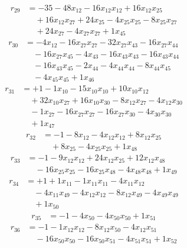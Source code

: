 \[\begin{aligned}
r_{29} &= - 35 - 48 x_{12} - 16 x_{12} x_{12} + 16 x_{12} x_{25} \\
 &\quad + 16 x_{12} x_{27} + 24 x_{25} - 4 x_{25} x_{25} - 8 x_{25} x_{27} \\
 &\quad + 24 x_{27} - 4 x_{27} x_{27} + 1 x_{45}
\end{aligned}\]
\[\begin{aligned}
r_{30} &= - 4 x_{12} - 16 x_{27} x_{27} - 32 x_{27} x_{43} - 16 x_{27} x_{44} \\
 &\quad - 16 x_{27} x_{45} - 4 x_{43} - 16 x_{43} x_{43} - 16 x_{43} x_{44} \\
 &\quad - 16 x_{43} x_{45} - 2 x_{44} - 4 x_{44} x_{44} - 8 x_{44} x_{45} \\
 &\quad - 4 x_{45} x_{45} + 1 x_{46}
\end{aligned}\]
\[\begin{aligned}
r_{31} &= + 1 - 1 x_{10} - 15 x_{10} x_{10} + 10 x_{10} x_{12} \\
 &\quad + 32 x_{10} x_{27} + 16 x_{10} x_{30} - 8 x_{12} x_{27} - 4 x_{12} x_{30} \\
 &\quad - 1 x_{27} - 16 x_{27} x_{27} - 16 x_{27} x_{30} - 4 x_{30} x_{30} \\
 &\quad + 1 x_{47}
\end{aligned}\]
\[\begin{aligned}
r_{32} &= - 1 - 8 x_{12} - 4 x_{12} x_{12} + 8 x_{12} x_{25} \\
 &\quad + 8 x_{25} - 4 x_{25} x_{25} + 1 x_{48}
\end{aligned}\]
\[\begin{aligned}
r_{33} &= - 1 - 9 x_{12} x_{12} + 24 x_{12} x_{25} + 12 x_{12} x_{48} \\
 &\quad - 16 x_{25} x_{25} - 16 x_{25} x_{48} - 4 x_{48} x_{48} + 1 x_{49}
\end{aligned}\]
\[\begin{aligned}
r_{34} &= + 1 + 1 x_{11} - 1 x_{11} x_{11} - 4 x_{11} x_{12} \\
 &\quad - 4 x_{11} x_{49} - 4 x_{12} x_{12} - 8 x_{12} x_{49} - 4 x_{49} x_{49} \\
 &\quad + 1 x_{50}
\end{aligned}\]
\[\begin{aligned}
r_{35} &= - 1 - 4 x_{50} - 4 x_{50} x_{50} + 1 x_{51}
\end{aligned}\]
\[\begin{aligned}
r_{36} &= - 1 - 1 x_{12} x_{12} - 8 x_{12} x_{50} - 4 x_{12} x_{51} \\
 &\quad - 16 x_{50} x_{50} - 16 x_{50} x_{51} - 4 x_{51} x_{51} + 1 x_{52}
\end{aligned}\]
